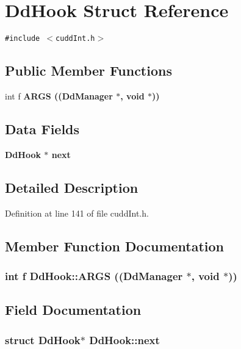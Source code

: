 \section{Dd\-Hook Struct Reference}
\label{structDdHook}
{\tt \#include $<$cudd\-Int.h$>$}

\subsection*{Public Member Functions}
\begin{CompactItemize}
\item 
int f \bf{ARGS} ((\bf{Dd\-Manager} $\ast$, void $\ast$))
\end{CompactItemize}
\subsection*{Data Fields}
\begin{CompactItemize}
\item 
\bf{Dd\-Hook} $\ast$ \bf{next}
\end{CompactItemize}


\subsection{Detailed Description}




Definition at line 141 of file cudd\-Int.h.

\subsection{Member Function Documentation}
\subsubsection{\setlength{\rightskip}{0pt plus 5cm}int f Dd\-Hook::ARGS ((\bf{Dd\-Manager} $\ast$, void $\ast$))}\label{structDdHook_1a81297e341a6e78b1679b5829dd2e2d}




\subsection{Field Documentation}
\subsubsection{\setlength{\rightskip}{0pt plus 5cm}struct \bf{Dd\-Hook}$\ast$ \bf{Dd\-Hook::next}}\label{structDdHook_f30b5d30fbe9fe96c61bf418c75f1038}




